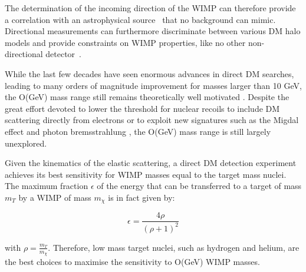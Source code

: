 \documentclass[physics,article,submit,moreauthors,pdftex]{Definitions/mdpi}
\begin{document}
The determination of the incoming direction of the WIMP can therefore provide a correlation with an astrophysical source~\cite{Mayet:2016zxu} that no background can mimic. Directional measurements can furthermore discriminate between various DM halo models and provide constraints on WIMP properties, like no other non-directional detector~\cite{Mayet:2016zxu}. 


While the last few decades have seen enormous advances in direct DM searches, leading to many orders of magnitude improvement for masses larger than 10 GeV, the O(GeV) mass range still remains theoretically well motivated \cite{bib:zurek, bib:petraki, bib:relic; bib:all}. Despite the great effort devoted to lower the threshold for nuclear recoils to include DM scattering directly from electrons  or to exploit new signatures such as the Migdal effect \cite{bib:bernabei,bib:migdal1,migdal2,bib:migdal3} and photon bremsstrahlung \cite{bib:subgev}, the O(GeV) mass range is still largely unexplored.

Given the kinematics of the elastic scattering, a direct DM detection experiment achieves its best sensitivity for WIMP masses equal to the target mass nuclei. The maximum fraction $\epsilon$ of the energy that can be transferred to a target of mass $m_T$ by a WIMP of mass $m_{\chi}$ is in fact given by:

\begin{equation}
\epsilon = \frac {4 \rho}{\left( \rho + 1 \right)^2}
\label{eq:eps}
\end{equation}

with $\rho = \frac{m_T}{m_{\chi}}$. Therefore, low mass target nuclei, such as hydrogen and helium, are the best choices to maximise the sensitivity to O(GeV) WIMP masses. 


\end{document}
